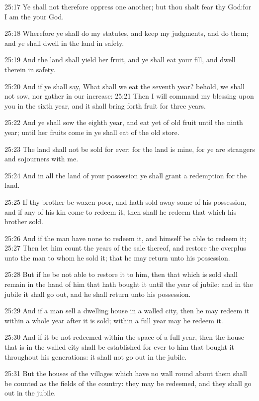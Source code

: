 25:17 Ye shall not therefore oppress one another; but thou shalt fear
thy God:for I am the \LORD your God.

25:18 Wherefore ye shall do my statutes, and keep my judgments, and do
them; and ye shall dwell in the land in safety.

25:19 And the land shall yield her fruit, and ye shall eat your fill,
and dwell therein in safety.

25:20 And if ye shall say, What shall we eat the seventh year? behold,
we shall not sow, nor gather in our increase: 25:21 Then I will
command my blessing upon you in the sixth year, and it shall bring
forth fruit for three years.

25:22 And ye shall sow the eighth year, and eat yet of old fruit until
the ninth year; until her fruits come in ye shall eat of the old
store.

25:23 The land shall not be sold for ever: for the land is mine, for
ye are strangers and sojourners with me.

25:24 And in all the land of your possession ye shall grant a
redemption for the land.

25:25 If thy brother be waxen poor, and hath sold away some of his
possession, and if any of his kin come to redeem it, then shall he
redeem that which his brother sold.

25:26 And if the man have none to redeem it, and himself be able to
redeem it; 25:27 Then let him count the years of the sale thereof, and
restore the overplus unto the man to whom he sold it; that he may
return unto his possession.

25:28 But if he be not able to restore it to him, then that which is
sold shall remain in the hand of him that hath bought it until the
year of jubile: and in the jubile it shall go out, and he shall return
unto his possession.

25:29 And if a man sell a dwelling house in a walled city, then he may
redeem it within a whole year after it is sold; within a full year may
he redeem it.

25:30 And if it be not redeemed within the space of a full year, then
the house that is in the walled city shall be established for ever to
him that bought it throughout his generations: it shall not go out in
the jubile.

25:31 But the houses of the villages which have no wall round about
them shall be counted as the fields of the country: they may be
redeemed, and they shall go out in the jubile.

